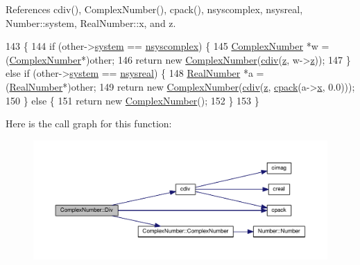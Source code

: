 References cdiv(), Complex\+Number(), cpack(), nsyscomplex, nsysreal, Number\+::system, Real\+Number\+::x, and z.


\begin{DoxyCode}
143 \{
144     \textcolor{keywordflow}{if} (other->\hyperlink{structNumber_a2ceda5601c42288626e76b06878e7476}{system} == \hyperlink{numb_8h_a1475a201d2346881ce88dfbacf628c7da3b38c947375a3db3a4bc184a11c8ee42}{nsyscomplex}) \{
145         \hyperlink{structComplexNumber}{ComplexNumber} *w = (\hyperlink{structComplexNumber}{ComplexNumber}*)other;
146         \textcolor{keywordflow}{return} \textcolor{keyword}{new} \hyperlink{structComplexNumber_a610e9db9ff0ddb0140e30d235ab64e44}{ComplexNumber}(\hyperlink{complex_8h_ace985b5f12a681b496bd3ae5f8a966b4}{cdiv}(\hyperlink{structComplexNumber_a5f72da71f4ce0d88076a391369239042}{z}, w->\hyperlink{structComplexNumber_a5f72da71f4ce0d88076a391369239042}{z}));
147     \} \textcolor{keywordflow}{else}  \textcolor{keywordflow}{if} (other->\hyperlink{structNumber_a2ceda5601c42288626e76b06878e7476}{system} == \hyperlink{numb_8h_a1475a201d2346881ce88dfbacf628c7dae72cf8673109b15268d1c0837e8bff86}{nsysreal}) \{
148         \hyperlink{structRealNumber}{RealNumber} *a = (\hyperlink{structRealNumber}{RealNumber}*)other;
149         \textcolor{keywordflow}{return} \textcolor{keyword}{new} \hyperlink{structComplexNumber_a610e9db9ff0ddb0140e30d235ab64e44}{ComplexNumber}(\hyperlink{complex_8h_ace985b5f12a681b496bd3ae5f8a966b4}{cdiv}(\hyperlink{structComplexNumber_a5f72da71f4ce0d88076a391369239042}{z}, \hyperlink{complex_8h_a980e6e049f7902b05fc9eb5614b07a5c}{cpack}(a->\hyperlink{structRealNumber_ac33d80bee75448490199a0aa48ccce1e}{x}, 0.0)));
150     \} \textcolor{keywordflow}{else} \{
151         \textcolor{keywordflow}{return} \textcolor{keyword}{new} \hyperlink{structComplexNumber_a610e9db9ff0ddb0140e30d235ab64e44}{ComplexNumber}();
152     \}
153 \}
\end{DoxyCode}


Here is the call graph for this function\+:\nopagebreak
\begin{figure}[H]
\begin{center}
\leavevmode
\includegraphics[width=350pt]{structComplexNumber_a78f07b5e0e9d481629e3814b6037522b_cgraph}
\end{center}
\end{figure}


